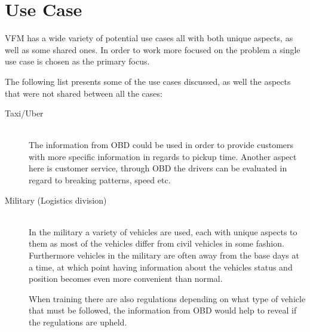 \section{Use Case}
\acl{VFM} has a wide variety of potential use cases all with both unique aspects, as well as some shared ones.
In order to work more focused on the problem a single use case is chosen as the primary focus.

The following list presents some of the use cases discussed, as well the aspects that were not shared between all the cases:

\begin{description}
    \item [Taxi/Uber] \hfill \\
    The information from \ac{OBD} could be used in order to provide customers with more specific information in regards to pickup time.
    Another aspect here is customer service, through \ac{OBD} the drivers can be evaluated in regard to breaking patterns, speed etc.
    \item [Military (Logistics division)] \hfill \\
    In the military a variety of vehicles are used, each with unique aspects to them as most of the vehicles differ from civil vehicles in some fashion.
    Furthermore vehicles in the military are often away from the base days at a time, at which point having information about the vehicles status and position becomes even more convenient than normal.

    When training there are also regulations depending on what type of vehicle that must be followed, the information from \ac{OBD} would help to reveal if the regulations are upheld.


\end{description}
